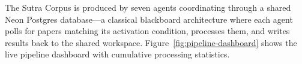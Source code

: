\documentclass{article}
\begin{document}
%
%
%
%
%

The Sutra Corpus is produced by seven agents coordinating through a shared Neon Postgres
database---a classical blackboard architecture where each agent polls for papers matching
its activation condition, processes them, and writes results back to the shared workspace.
Figure~\ref{fig:pipeline-dashboard} shows the live pipeline dashboard with cumulative
processing statistics.
\end{document}
